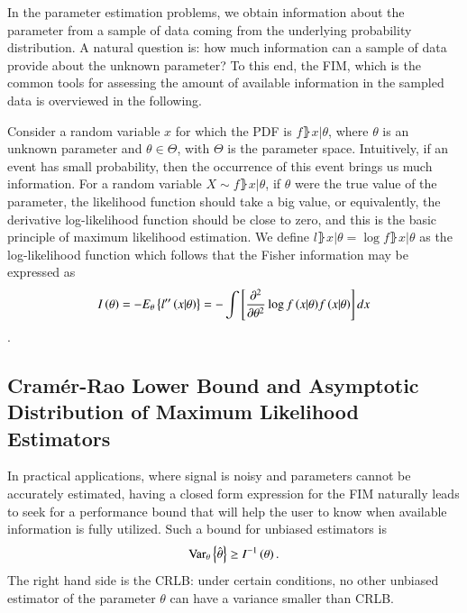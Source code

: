 In the parameter estimation problems, we obtain information about the parameter from a sample of data coming from the underlying probability distribution. 
A natural question is: how much information can a sample of data provide about the unknown parameter? 
To this end, the FIM, which is the common tools for assessing the amount of available information in the sampled data is overviewed in the following.
\par
Consider a random variable $x$ for which the PDF is $f\rBrace{x|\theta}$, where $\theta$ is an unknown parameter and $\theta\in\Theta$, with $\Theta$ is the parameter space.
Intuitively, if an event has small probability, then the occurrence of this event brings us much information.
For a random variable $X \sim f\rBrace{x|\theta}$, if $\theta$ were the true value of the parameter, the likelihood function should take a big value, or equivalently, the derivative log-likelihood function should be close to zero, and this is the basic principle of maximum likelihood estimation.
We define $l\rBrace{x|\theta} = \log{f\rBrace{x|\theta}}$ as the log-likelihood function which follows that the Fisher information may be expressed \cite{van2004detection} as 
\begin{equation}
\label{eq_prlm_Ifin}
    I\left({\theta}\right) = -E_{\theta}\left\{{l^{\prime\prime}\left({x|\theta}\right)}\right\}=-\int{\left[{\frac{\partial^{2}}{\partial\theta^{2}}\log{f\left({x|\theta}\right)}f\left({x|\theta}\right)}\right]dx}
\end{equation}.
\subsection{Cram\'er-Rao Lower Bound and Asymptotic Distribution of Maximum Likelihood Estimators}
In practical applications, where signal is noisy and parameters cannot be accurately estimated, having a closed form expression for the FIM naturally leads to seek for a performance bound that will help the user to know when available information is fully utilized.
Such a bound for unbiased estimators is \cite{van2004detection}
\begin{equation*}
    \text{Var}_{\theta}\cBrace{\hat{\theta}}\geq{}I^{-1}\rBrace{\theta}.%
\end{equation*}
The right hand side is the CRLB: under certain conditions, no other unbiased estimator of the parameter $\theta$ can have a variance smaller than CRLB.
